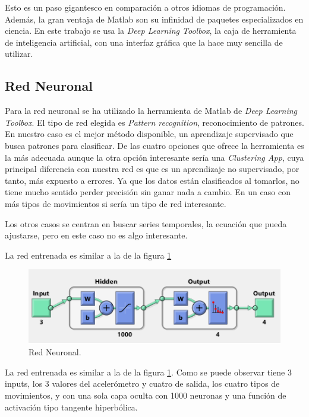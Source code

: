\documentclass[12pt]{article}
\numberwithin{equation}{section}
\begin{document}
Esto es un paso gigantesco en comparación a otros idiomas de programación. Además, la gran ventaja de Matlab son su infinidad de paquetes especializados en ciencia. En este trabajo se usa la \textit{Deep Learning Toolbox}, la caja de herramienta de inteligencia artificial, con una interfaz gráfica que la hace muy sencilla de utilizar.

\subsection{Red Neuronal}

Para la red neuronal se ha utilizado la herramienta de Matlab de \textit{Deep Learning Toolbox}\cite{Matlab}. El tipo de red elegida es  \textit{Pattern recognition}, reconocimiento de patrones. En nuestro caso es el mejor método disponible, un aprendizaje supervisado que busca patrones para clasificar. De las cuatro opciones que ofrece la herramienta es la más adecuada aunque la otra opción interesante sería una \textit{Clustering App}, cuya principal diferencia con nuestra red es que es un aprendizaje no supervisado, por tanto, más expuesto a errores. Ya que los datos están clasificados al tomarlos, no tiene mucho sentido perder precisión sin ganar nada a cambio. En un caso con más tipos de movimientos si sería un tipo de red interesante.

Los otros casos se centran en buscar series temporales, la ecuación que pueda ajustarse, pero en este caso no es algo interesante.

La red entrenada es similar a la de la figura \ref{fig:redneuronal}

\begin{figure}[h]
    \centering
    \includegraphics[width=1\textwidth]{redneuronal.png}
    \caption{Red Neuronal.}
    \label{fig:redneuronal}
\end{figure}

La red entrenada es similar a la de la figura \ref{fig:redneuronal}. Como se puede observar tiene 3 inputs, los 3 valores del acelerómetro y cuatro de salida, los cuatro tipos de movimientos, y con una sola capa oculta con 1000 neuronas y una función de activación tipo tangente hiperbólica.
\end{document}
